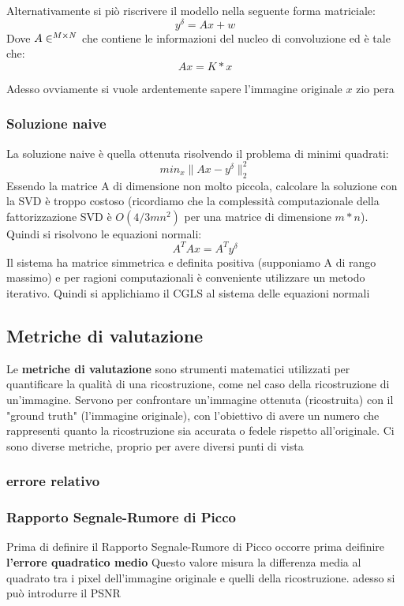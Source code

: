 Alternativamente si piò riscrivere il modello nella seguente forma matriciale:
\[
    y^\delta = Ax + w    
\]
Dove $A\in\real^{M\times N}$ che contiene le informazioni del nucleo
di convoluzione ed è tale che:
\[
    Ax = K * x
\]

Adesso ovviamente si vuole ardentemente sapere l'immagine originale $x$ zio pera
\subsubsection{Soluzione naive}
La soluzione naive è quella ottenuta risolvendo il problema di minimi quadrati:
\[
    min_x \|Ax-y^\delta\|_2^2    
\]
Essendo la matrice A di dimensione non molto piccola, calcolare la soluzione con la SVD è troppo costoso (ricordiamo che la complessità computazionale della fattorizzazione SVD è $O(4/3mn^2 )$ per una matrice di dimensione $m*n$). Quindi si risolvono le equazioni
normali:
\[
    A^TAx=A^Ty^\delta    
\]
Il sistema ha matrice simmetrica e definita positiva (supponiamo A di rango massimo) e per ragioni computazionali è conveniente utilizzare un metodo iterativo. Quindi  si applichiamo il CGLS al sistema delle equazioni normali
\subsection{Metriche di valutazione}
Le \textbf{metriche di valutazione} sono strumenti matematici utilizzati per quantificare la qualità di una ricostruzione, come nel caso della ricostruzione di un'immagine. Servono per confrontare un'immagine ottenuta (ricostruita) con il "ground truth" (l'immagine originale), con l'obiettivo di avere un numero che rappresenti quanto la ricostruzione sia accurata o fedele rispetto all'originale. Ci sono diverse metriche, proprio per avere diversi punti di vista
\subsubsection{errore relativo}
\subsubsection{Rapporto Segnale-Rumore di Picco}
Prima di definire il Rapporto Segnale-Rumore di Picco occorre prima deifinire \textbf{l'errore quadratico medio} 
Questo valore misura la differenza media al quadrato tra i pixel dell’immagine originale e quelli della ricostruzione. adesso si può introdurre il PSNR

